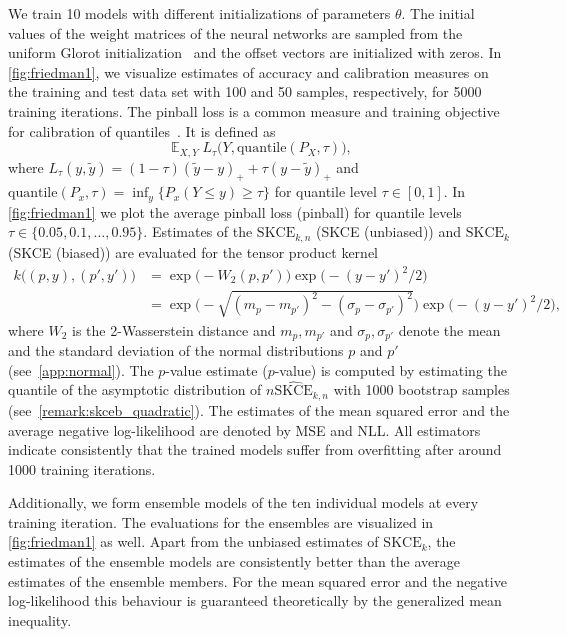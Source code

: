 \documentclass{article}
\DeclareMathOperator{\Exp}{\mathbb{E}}
\begin{document}
We train 10 models with different initializations of parameters $\theta$. The initial values
of the weight matrices of the neural networks are sampled from the uniform Glorot
initialization~\citep{Glorot2010} and the offset vectors are initialized with zeros.
In \cref{fig:friedman1}, we visualize estimates of accuracy and calibration measures
on the training and test data set with 100 and 50 samples, respectively, for
5000 training iterations. The pinball loss is a common measure and
training objective for calibration of quantiles~\citep{Song2019}. It is defined
as
\begin{equation*}
    \Exp_{X,Y} L_{\tau}\big(Y, \mathrm{quantile}(P_X, \tau)\big),
\end{equation*}
where $L_{\tau}(y, \tilde{y}) = (1 - \tau) (\tilde{y} - y)_{+} + \tau (y - \tilde{y})_{+}$
and $\mathrm{quantile}(P_x, \tau) = \inf_{y} \{P_x(Y \leq y) \geq \tau\}$ for
quantile level $\tau \in [0, 1]$.
In \cref{fig:friedman1} we plot the average pinball loss (pinball) for
quantile levels $\tau \in \{0.05, 0.1, \ldots, 0.95\}$. Estimates of the $\mathrm{SKCE}_{k,n}$
(SKCE (unbiased)) and $\mathrm{SKCE}_{k}$ (SKCE (biased)) are evaluated for the tensor product kernel
\begin{equation*}
    \begin{split}
        k\big((p, y), (p', y')\big) &= \exp{\big(-W_2(p, p')\big)} \exp{\big(-(y - y')^2/2 \big)} \\
        &= \exp{\bigg(-\sqrt{(m_p - m_{p'})^2 - (\sigma_p - \sigma_{p'})^2}\bigg)} \exp{\big(- (y - y')^2/2\big)},
    \end{split}
\end{equation*}
where $W_2$ is the 2-Wasserstein distance and $m_p, m_{p'}$ and $\sigma_p, \sigma_{p'}$ denote
the mean and the standard deviation of the normal distributions $p$ and $p'$ (see~\cref{app:normal}).
The $p$-value estimate ($p$-value) is computed by estimating the quantile of the asymptotic distribution
of $n \widehat{\mathrm{SKCE}}_{k,n}$ with 1000 bootstrap samples
(see~\cref{remark:skceb_quadratic}). The estimates of the mean squared error
and the average negative log-likelihood are denoted by MSE and NLL.
All estimators indicate consistently that the trained models suffer from overfitting
after around 1000 training iterations.

Additionally, we form ensemble models of the ten individual models at every training
iteration. The evaluations for the ensembles are visualized in \cref{fig:friedman1} as
well. Apart from the unbiased estimates of $\mathrm{SKCE}_k$, the estimates of the
ensemble models are consistently better than the average estimates of the ensemble
members. For the mean squared error and the negative log-likelihood this behaviour
is guaranteed theoretically by the generalized mean inequality.
\end{document}

